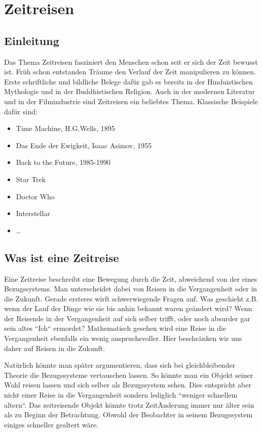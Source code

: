 \chapter{Zeitreisen\label{chapter:thema}}
\begin{refsection}

\section{Einleitung}

Das Thema Zeitreisen fasziniert den Menschen schon seit er sich der Zeit bewusst ist. Früh schon entstanden Träume den Verlauf der Zeit manipulieren zu können. Erste schriftliche und bildliche Belege dafür gab es bereits in der Hinduistischen Mythologie und in der Buddhistischen Religion. Auch in der modernen Literatur und in der Filmindustrie sind Zeitreisen ein beliebtes Thema. Klassische Beispiele daf\"ur sind: 

\begin{itemize}
    \item Time Machine, H.G.Wells, 1895 
    \item Das Ende der Ewigkeit, Isaac Asimov, 1955
    \item Back to the Future, 1985-1990
    \item Star Trek
    \item Doctor Who
    \item Interstellar
    \item \ldots
\end{itemize}

\section{Was ist eine Zeitreise}

Eine Zeitreise beschreibt eine Bewegung durch die Zeit, abweichend von der eines Bezugssystems. Man unterscheidet dabei von Reisen in die Vergangenheit oder in die Zukunft. Gerade ersteres wirft schwerwiegende Fragen auf. Was geschieht z.B. wenn der Lauf der Dinge wie sie bis anhin bekannt waren geändert wird? Wenn der Reisende in der Vergangenheit auf sich selber trifft, oder noch absurder gar sein altes ``Ich`` ermordet? 
Mathematisch gesehen wird eine Reise in die Vergangenheit ebenfalls ein wenig anspruchsvoller. Hier beschränken wir uns daher auf Reisen in die Zukunft. 

Natürlich könnte man später argumentieren, dass sich bei gleichbleibender Theorie die Bezugssysteme vertauschen lassen. So könnte man ein Objekt seiner Wahl reisen lassen und sich selber als Bezugssystem sehen. Dies entspricht aber nicht einer Reise in die Vergangenheit sondern lediglich ``weniger schnellem altern``. Das zeitreisende  Objekt könnte trotz Zeit\"Anderung immer nur älter sein als zu Beginn der Betrachtung. Obwohl der Beobachter in seinem Bezugssystem einiges schneller gealtert wäre.


\end{refsection}
